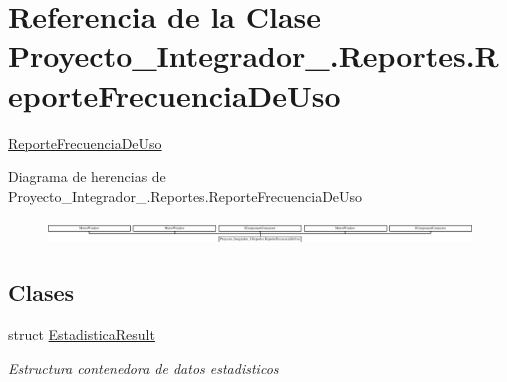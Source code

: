 \hypertarget{class_proyecto___integrador__3_1_1_reportes_1_1_reporte_frecuencia_de_uso}{\section{Referencia de la Clase Proyecto\-\_\-\-Integrador\-\_.\-Reportes.\-Reporte\-Frecuencia\-De\-Uso}
\label{class_proyecto___integrador__3_1_1_reportes_1_1_reporte_frecuencia_de_uso}
}


\hyperlink{class_proyecto___integrador__3_1_1_reportes_1_1_reporte_frecuencia_de_uso}{Reporte\-Frecuencia\-De\-Uso}  


Diagrama de herencias de Proyecto\-\_\-\-Integrador\-\_.\-Reportes.\-Reporte\-Frecuencia\-De\-Uso\begin{figure}[H]
\begin{center}
\leavevmode
\includegraphics[height=0.632768cm]{d5/d69/class_proyecto___integrador__3_1_1_reportes_1_1_reporte_frecuencia_de_uso}
\end{center}
\end{figure}
\subsection*{Clases}
\begin{DoxyCompactItemize}
\item 
struct \hyperlink{struct_proyecto___integrador__3_1_1_reportes_1_1_reporte_frecuencia_de_uso_1_1_estadistica_result}{Estadistica\-Result}
\begin{DoxyCompactList}\small\item\em Estructura contenedora de datos estadisticos \end{DoxyCompactList}\end{DoxyCompactItemize}
